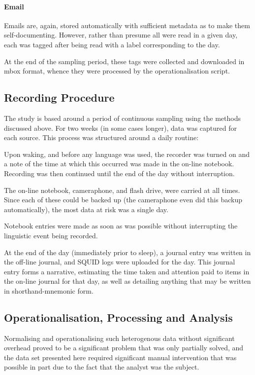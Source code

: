 \paragraph{Email}
Emails are, again, stored automatically with sufficient metadata as to make them self-documenting.  However, rather than presume all were read in a given day, each was tagged after being read with a label corresponding to the day.

At the end of the sampling period, these tags were collected and downloaded in mbox format, whence they were processed by the operationalisation script.









\subsection{Recording Procedure}
\label{sec:personal:recording}
The study is based around a period of continuous sampling using the methods discussed above.  For two weeks (in some cases longer), data was captured for each source.  This process was structured around a daily routine:

Upon waking, and before any language was used, the recorder was turned on and a note of the time at which this occurred was made in the on-line notebook.  Recording was then continued until the end of the day without interruption.

The on-line notebook, cameraphone, and flash drive, were carried at all times.  Since each of these could be backed up (the cameraphone even did this backup automatically), the most data at risk was a single day.

Notebook entries were made as soon as was possible without interrupting the linguistic event being recorded.

At the end of the day (immediately prior to sleep), a journal entry was written in the off-line journal, and SQUID logs were uploaded for the day.  This journal entry forms a narrative, estimating the time taken and attention paid to items in the on-line journal for that day, as well as detailing anything that may be written in shorthand-mnemonic form.










\subsection{Operationalisation, Processing and Analysis}
Normalising and operationalising such heterogenous data without significant overhead proved to be a significant problem that was only partially solved, and the data set presented here required significant manual intervention that was possible in part due to the fact that the analyst was the subject.


